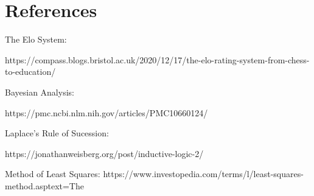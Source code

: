 \documentclass[12pt]{article}
\begin{document}
\newpage
\section*{References}
\begin{flushleft}
The Elo System:

https://compass.blogs.bristol.ac.uk/2020/12/17/the-elo-rating-system-from-chess-to-education/

Bayesian Analysis:

https://pmc.ncbi.nlm.nih.gov/articles/PMC10660124/

Laplace's Rule of Sucession:

https://jonathanweisberg.org/post/inductive-logic-2/

Method of Least Squares:
https://www.investopedia.com/terms/l/least-squares-method.asptext=The%
\end{flushleft}
\end{document}
